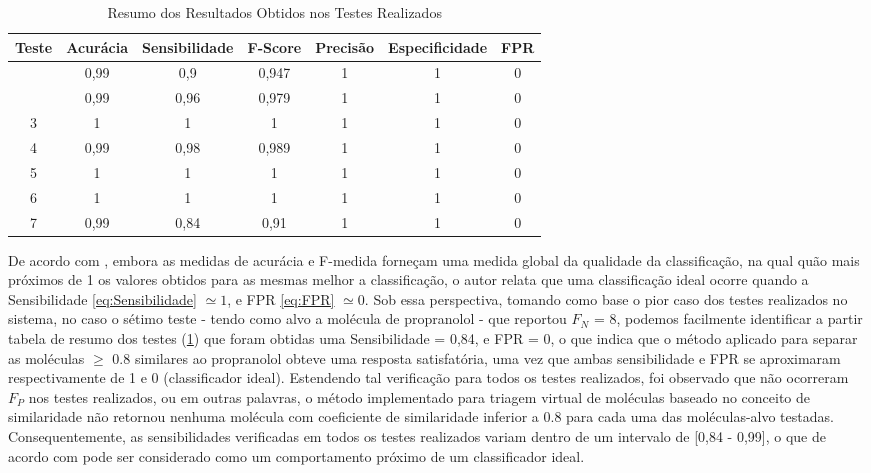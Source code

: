 \begin{table}[!htb]
	\centering
	\footnotesize
	\caption[Resumo dos Resultados Obtidos nos Testes Realizados]{Resumo dos Resultados Obtidos nos Testes Realizados}
	\label{tab:ResumoResultados}	
	\begin{tabular}{|c|c|c|c|c|c|c|}
		\hline \SPACE
		\textbf{Teste}&\textbf{Acurácia}&\textbf{Sensibilidade}&\textbf{F-Score}&\textbf{Precisão}&\textbf{Especificidade}&\textbf{FPR} \\ \hline \SPACE
	1\textordmasculine &0,99&0,9&0,947&1&1&0 \\ \hline \SPACE
	2\textordmasculine &0,99&0,96&0,979&1&1&0\\ \hline 
	3\textordmasculine &1&1&1&1&1&0\\ \hline
	4\textordmasculine &0,99&0,98&0,989&1&1&0\\ \hline
	5\textordmasculine &1&1&1&1&1&0\\ \hline
	6\textordmasculine &1&1&1&1&1&0\\ \hline
	7\textordmasculine &0,99&0,84&0,91&1&1&0\\ \hline
	\end{tabular}
\end{table}
 
De acordo com , embora as medidas de acurácia e F-medida forneçam uma medida global da qualidade da classificação, na qual quão mais próximos de 1 os valores obtidos para as mesmas melhor a classificação, o autor relata que uma classificação ideal ocorre quando a Sensibilidade \eqref{eq:Sensibilidade} $\simeq 1$, e FPR \eqref{eq:FPR}  $\simeq 0$. Sob essa perspectiva, tomando como base o pior caso dos testes realizados no sistema, no caso o sétimo teste - tendo como alvo a molécula de propranolol - que reportou $F_N$ = 8, podemos facilmente identificar a partir tabela de resumo dos testes (\ref{tab:ResumoResultados}) que foram obtidas uma Sensibilidade = 0,84, e FPR = 0, o que indica que o método aplicado para separar as moléculas $\geq$ 0.8 similares ao propranolol obteve uma resposta satisfatória, uma vez que ambas sensibilidade e FPR se aproximaram respectivamente de 1 e 0 (classificador ideal). Estendendo tal verificação para todos os testes realizados, foi observado que não ocorreram $F_P$ nos testes realizados, ou em outras palavras, o método  implementado para triagem virtual de moléculas baseado no conceito de similaridade não retornou nenhuma molécula com coeficiente de similaridade inferior a 0.8 para cada uma das moléculas-alvo testadas. Consequentemente, as sensibilidades verificadas em todos os testes realizados variam dentro de um intervalo de [0,84 - 0,99], o que de acordo com   pode ser considerado como um comportamento próximo de um classificador ideal.




            


   

   